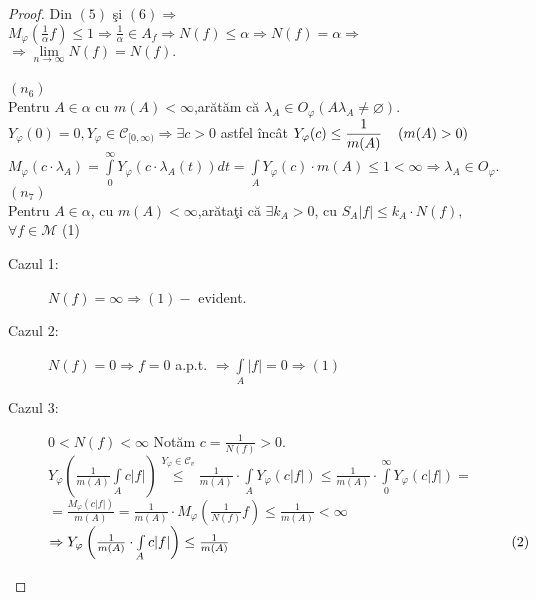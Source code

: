 \documentclass[ a4paper, 12pt]{report}
\theoremstyle{remark}
\numberwithin{equation}{section}
\begin{document}
\begin{proof}
Din $(5)$ \c si $(6) \Rightarrow$  $M_\varphi(\frac{1}{\alpha}f)\leq 1 \Rightarrow \frac{1}{\alpha} \in A_f \Rightarrow N(f) \leq \alpha \Rightarrow N(f) = \alpha \Rightarrow$\\$\Rightarrow \lim\limits_{n \rightarrow \infty} N(f) = N(f).$\\
\\
$(n_6)$
\\
 Pentru $A \in \alpha$ cu $m(A)<\infty$,ar\u at\u am c\u a $\lambda_A \in O_\varphi (A \lambda_A \neq \varnothing).$\\
$Y_\varphi(0) = 0, Y_\varphi \in \mathcal{C}_{{[0,\infty)}} \Rightarrow \exists c>0$ astfel \^inc\^at $Y_\varphi (c) \leq \displaystyle{\frac{1}{m(A)}}\hspace{4mm}  (m(A)>0)$\\
$M_\varphi(c \cdot \lambda_A) = \int\limits_{0}^{\infty} Y_\varphi \left (c \cdot \lambda_A(t)\right ) dt = \int\limits_{A}Y_\varphi (c)\cdot m(A) \leq 1 < \infty \Rightarrow \lambda_A \in O_\varphi.$\\
$(n_7)$\\
 Pentru $A \in \alpha$, cu $m(A)<\infty$,ar\u ata\c ti c\u a $\exists k_A>0$,
 cu $S_A \lvert f  \rvert \leq k_A \cdot N(f),$\\$\forall f \in \mathcal{M}$   \hspace{67mm}  (1)\\
\begin{description}
\item[Cazul 1:] $N(f) = \infty \Rightarrow (1)-$ evident.
\item[Cazul 2:] $N(f) = 0 \Rightarrow f = 0$ a.p.t. $\Rightarrow \int\limits_{A} \lvert f \rvert = 0 \Rightarrow (1)$
\item[Cazul 3:] $0<N(f)<\infty$ Not\u am $c = \frac{1}{N(f)} > 0.$\\
$Y_\varphi \left (\frac{1}{m(A)} \int\limits_{A} c \lvert f \rvert \right ) \stackrel{Y_\varphi \in \mathcal{C}_v}{\leq}\frac{1}{m(A)} \cdot \int\limits_{A} Y_\varphi(c\lvert f \rvert) \leq \frac{1}{m(A)} \cdot \int\limits_{0}^{\infty} Y_\varphi (c \lvert f \rvert) =$\\ $= \frac{M_\varphi(c\lvert f \rvert)}{m(A)} = \frac{1}{m(A)} \cdot M_\varphi(\frac{1}{N(f)}f) \leq \frac{1}{m(A)} < \infty$ \\
$\Rightarrow Y_\varphi \left (\frac{1}{m(A)} \cdot \int\limits_{A} c \lvert f \rvert\right ) \leq \frac{1}{m(A)}  \hspace{71mm}(2)$
\end{description}
\end{proof}
\end{document}
